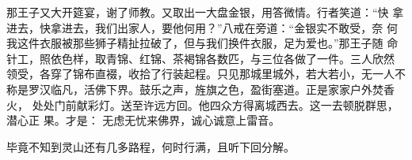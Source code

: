 那王子又大开筵宴，谢了师教。又取出一大盘金银，用答微情。行者笑道：“快
拿进去，快拿进去，我们出家人，要他何用？”八戒在旁道：“金银实不敢受，奈
何我这件衣服被那些狮子精扯拉破了，但与我们换件衣服，足为爱也。”那王子随
命针工，照依色样，取青锦、红锦、茶褐锦各数匹，与三位各做了一件。三人欣然
领受，各穿了锦布直裰，收拾了行装起程。只见那城里城外，若大若小，无一人不
称是罗汉临凡，活佛下界。鼓乐之声，旌旗之色，盈街塞道。正是家家户外焚香火，
处处门前献彩灯。送至许远方回。他四众方得离城西去。这一去顿脱群思，潜心正
果。才是：
无虑无忧来佛界，诚心诚意上雷音。

毕竟不知到灵山还有几多路程，何时行满，且听下回分解。